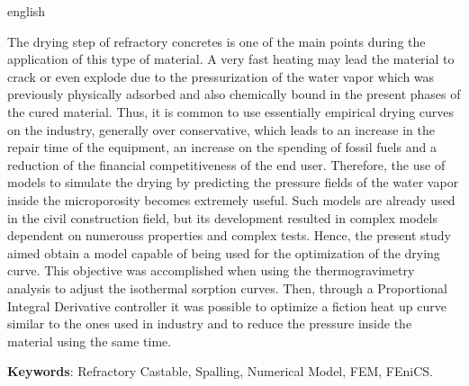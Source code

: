 \documentclass[
	12pt,				%
	openright,			%
	twoside,			%
	a4paper,			%
	chapter=TITLE,		%
	english,			%
	french,				%
	spanish,			%
	brazil,				%
	hyphens,
  oldfontcommands]{abntex2}
\theoremstyle{definition}
\theoremstyle{definition}
\begin{document}
\begin{resumo}[Abstract]
\begin{otherlanguage*}{english}
\vspace{\onelineskip}

\noindent
The drying step of refractory concretes is one of the main points during the
application of this type of material. A very fast heating may lead the material
to crack or even explode due to the pressurization of the water vapor which was
previously physically adsorbed and also chemically bound in the present phases
of the cured material. Thus, it is common to use essentially empirical drying
curves on the industry, generally over conservative, which leads to an increase
in the repair time of the equipment, an increase on the spending of fossil fuels
and a reduction of the financial competitiveness of the end user. Therefore, the
use of models to simulate the drying by predicting the pressure fields of the
water vapor inside the microporosity becomes extremely useful. Such models are
already used in the civil construction field, but its development resulted in
complex models dependent on numerouss properties and complex tests. Hence, the
present study aimed obtain a model capable of being used for the
optimization of the drying curve. This objective was accomplished when using the
thermogravimetry analysis to adjust the isothermal sorption curves. Then,
through a Proportional Integral Derivative controller it was possible to
optimize a fiction heat up curve similar to the ones used in industry and to
reduce the pressure inside the material using the same time.

   \textbf{Keywords}: Refractory Castable, Spalling, Numerical Model, FEM, FEniCS.
   
 \end{otherlanguage*}
\end{resumo}

 
 

  
\end{document}

